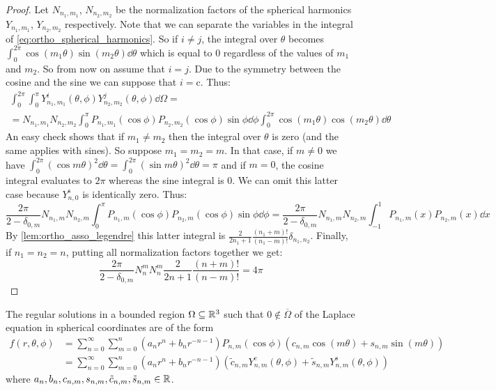 \documentclass[../main.tex]{subfiles}
\begin{document}
\begin{proof}
  Let $N_{n_1,m_1}$, $N_{n_2,m_2}$ be the normalization factors of the spherical harmonics $Y_{n_1,m_1}$, $Y_{n_2,m_2}$ respectively. Note that we can separate the variables in the integral of \cref{eq:ortho_spherical_harmonics}. So if $i\ne j$, the integral over $\theta$ becomes $\int_0^{2\pi}\cos(m_1\theta)\sin(m_2\theta)\dd{\theta}$ which is equal to 0 regardless of the values of $m_1$ and $m_2$. So from now on assume that $i=j$. Due to the symmetry between the cosine and the sine we can suppose that $i=\mathrm{c}$. Thus:
  \begin{multline}
    \int_0^{2\pi}\int_0^\pi Y_{n_1,m_1}^i(\theta,\phi) Y_{n_2,m_2}^j(\theta,\phi)\dd\Omega=\\= N_{n_1,m_1}N_{n_2,m_2}\int_0^\pi P_{n_1,m_1}(\cos\phi) P_{n_2,m_2}(\cos\phi)\sin\phi\dd\phi\int_{0}^{2\pi}\cos(m_1\theta)\cos(m_2\theta)\dd{\theta}
  \end{multline}
  An easy check shows that if $m_1\neq m_2$ then the integral over $\theta$ is zero (and the same applies with sines). So suppose $m_1=m_2=m$. In that case, if $m\ne 0$ we have $\int_{0}^{2\pi}{(\cos m\theta)}^2\dd{\theta}=\int_{0}^{2\pi}{(\sin m\theta)}^2\dd{\theta}=\pi$ and if $m=0$, the cosine integral evaluates to $2\pi$ whereas the sine integral is 0. We can omit this latter case because $Y_{n,0}^{\mathrm{s}}$ is identically zero. Thus:
  \begin{equation}
    \frac{2\pi}{2-\delta_{0,m}} N_{n_1,m}N_{n_2,m}\int_0^\pi P_{n_1,m}(\cos\phi) P_{n_2,m}(\cos\phi)\sin\phi\dd\phi=\frac{2\pi}{2-\delta_{0,m}} N_{n_1,m}N_{n_2,m}\int_{-1}^1 P_{n_1,m}(x) P_{n_2,m}(x)\dd{x}
  \end{equation}
  By \cref{lem:ortho_asso_legendre} this latter integral is $\frac{2}{2n_1+1}\frac{(n_1+m)!}{(n_1-m)!} \delta_{n_1,n_2}$. Finally, if $n_1=n_2=n$, putting all normalization factors together we get:
  \begin{equation}
    \frac{2\pi}{2-\delta_{0,m}} N_{n}^{m}N_{n}^{m}\frac{2}{2n+1}\frac{(n+m)!}{(n-m)!}=4\pi
  \end{equation}
\end{proof}
\begin{theorem}
  The regular solutions in a bounded region $\Omega\subseteq \mathbb{R}^3$ such that $0\notin\overline{\Omega}$ of the Laplace equation in spherical coordinates are of the form
  \begin{align}
    f(r,\theta,\phi) & = \sum_{n=0}^\infty \sum_{m=0}^n (a_n r^{n} +b_{n}r^{-n-1})P_{n,m}(\cos\phi) (c_{n,m}\cos(m\theta)+s_{n,m}\sin(m\theta))                                                              \\
                     & \label{eq:sol_laplace} = \sum_{n=0}^\infty \sum_{m=0}^n (a_n r^{n} +b_{n}r^{-n-1})(\tilde{c}_{n,m}Y_{n,m}^{\mathrm{c}}(\theta,\phi)+\tilde{s}_{n,m}Y_{n,m}^{\mathrm{s}}(\theta,\phi))
  \end{align}
  where $a_n,b_n,c_{n,m},s_{n,m},\tilde{c}_{n,m},\tilde{s}_{n,m}\in\mathbb{R}$.
\end{theorem}
\end{document}
